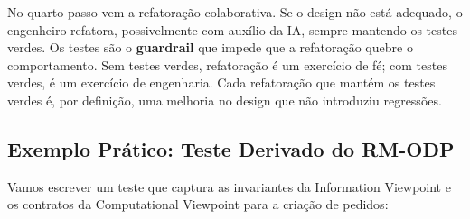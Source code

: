 No quarto passo vem a refatoração colaborativa. Se o design não está adequado,
o engenheiro refatora, possivelmente com auxílio da IA, sempre mantendo
os testes verdes. Os testes são o \textbf{guardrail} que impede que a
refatoração quebre o comportamento. Sem testes verdes, refatoração é um
exercício de fé; com testes verdes, é um exercício de engenharia. Cada
refatoração que mantém os testes verdes é, por definição, uma melhoria no
design que não introduziu regressões.

\subsection{Exemplo Prático: Teste Derivado do RM-ODP}

Vamos escrever um teste que captura as invariantes da Information Viewpoint e os
contratos da Computational Viewpoint para a criação de pedidos:


